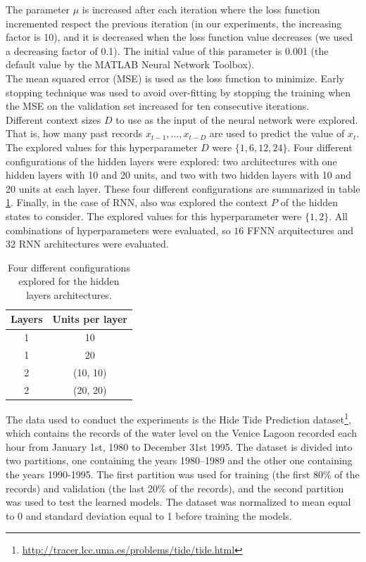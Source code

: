 \documentclass[10pt,a4paper]{article}
\begin{document}
The parameter $\mu$ is increased after each iteration where the loss function incremented respect the previous iteration (in our experiments, the increasing factor is 10), and it is decreased when the loss function value decreases (we used a decreasing factor of 0.1). The initial value of this parameter is 0.001 (the default value by the MATLAB Neural Network Toolbox).\\

The mean squared error (MSE) is used as the loss function to minimize. Early stopping technique was used to avoid over-fitting by stopping the training when the MSE on the validation set increased for ten consecutive iterations.\\

Different context sizes $D$ to use as the input of the neural network were explored. That is, how many past records $x_{t-1}, \ldots, x_{t-D}$ are used to predict the value of $x_t$. The explored values for this hyperparameter $D$ were $\{1, 6, 12, 24\}$. Four different configurations of the hidden layers were explored: two architectures with one hidden layers with 10 and 20 units, and two with two hidden layers with 10 and 20 units at each layer. These four different configurations are summarized in table \ref{tab:hidden_configs}. Finally, in the case of RNN, also was explored the context $P$ of the hidden states to consider. The explored values for this hyperparameter were $\{1, 2\}$. All combinations of hyperparameters were evaluated, so $16$ FFNN arquitectures and $32$ RNN architectures  were evaluated.

\begin{table}[h]
\centering
\begin{tabular}{|c|c|}
\hline
Layers & Units per layer\\
\hline
1 & 10\\
1 & 20\\
2 & (10, 10)\\
2 & (20, 20)\\
\hline
\end{tabular}
\caption{Four different configurations explored for the hidden layers architectures.}
\label{tab:hidden_configs}
\end{table}

The data used to conduct the experiments is the Hide Tide Prediction dataset\footnote{\url{http://tracer.lcc.uma.es/problems/tide/tide.html}}\cite{ZGG00}, which contains the records of the water level on the Venice Lagoon recorded each hour from January 1st, 1980 to December 31st 1995. The dataset is divided into two partitions, one containing the years 1980--1989 and the other one containing the years 1990-1995. The first partition was used for training (the first 80\% of the records) and validation (the last 20\% of the records), and the second partition was used to test the learned models. The dataset was normalized to mean equal to 0 and standard deviation equal to 1 before training the models.\\
\end{document}
